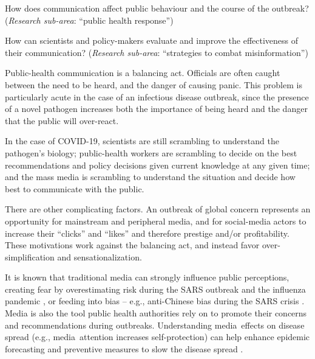  How does communication affect public behaviour and the course of the outbreak? (\emph{Research sub-area}: ``public health response'')  

 How can scientists and policy-makers evaluate and improve the effectiveness of their communication? (\emph{Research sub-area}: ``strategies to combat misinformation'')


Public-health communication is a balancing act. Officials are often caught between the need to be heard, and the danger of causing panic. This problem is particularly acute in the case of an infectious disease outbreak, since the presence of a novel pathogen increases both the importance of being heard and the danger that the public will over-react. 

In the case of COVID-19, scientists are still scrambling to understand the pathogen's biology; public-health workers are scrambling to decide on the best recommendations and policy decisions given current knowledge at any given time; and the mass media is scrambling to understand the situation and decide how best to communicate with the public. 

There are other complicating factors. An outbreak of global concern represents an opportunity for mainstream and peripheral media, and for social-media actors to increase their ``clicks'' and ``likes'' and therefore prestige and/or profitability. These motivations work against the balancing act, and instead favor over-simplification and sensationalization.

It is known that traditional media can strongly influence public perceptions, creating fear by overestimating risk during the SARS outbreak \citep{BerrWhar07} and the influenza pandemic \citep{TchuDube11}, or feeding into bias -- e.g., anti-Chinese bias during the SARS crisis \citep{HuanLeun06}.  Media is also the tool public health authorities rely on to promote their concerns and recommendations during outbreaks.  Understanding media effects on disease spread (e.g., media attention increases self-protection) can help enhance epidemic forecasting and preventive measures to slow the disease spread \citep{KimFast19}.  

